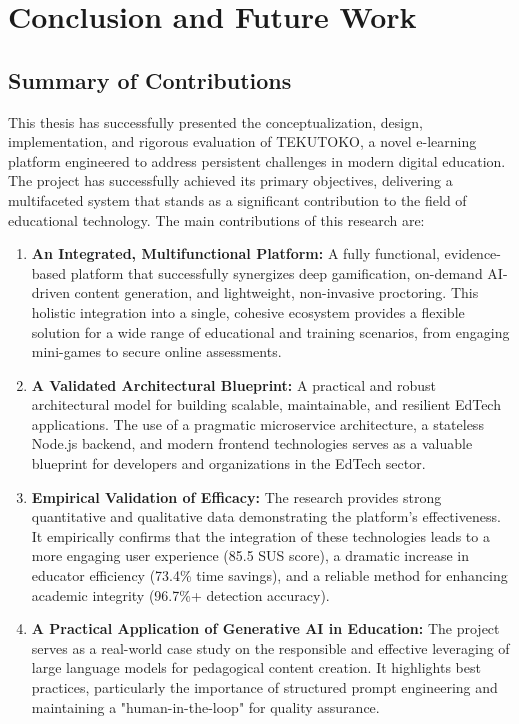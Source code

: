 \chapter{Conclusion and Future Work}
\label{chap:conclusion}

\section{Summary of Contributions}
\label{sec:conclusion-summary}
This thesis has successfully presented the conceptualization, design, implementation, and rigorous evaluation of TEKUTOKO, a novel e-learning platform engineered to address persistent challenges in modern digital education. The project has successfully achieved its primary objectives, delivering a multifaceted system that stands as a significant contribution to the field of educational technology. The main contributions of this research are:

\begin{enumerate}
    \item \textbf{An Integrated, Multifunctional Platform:} A fully functional, evidence-based platform that successfully synergizes deep gamification, on-demand AI-driven content generation, and lightweight, non-invasive proctoring. This holistic integration into a single, cohesive ecosystem provides a flexible solution for a wide range of educational and training scenarios, from engaging mini-games to secure online assessments.

    \item \textbf{A Validated Architectural Blueprint:} A practical and robust architectural model for building scalable, maintainable, and resilient EdTech applications. The use of a pragmatic microservice architecture, a stateless Node.js backend, and modern frontend technologies serves as a valuable blueprint for developers and organizations in the EdTech sector.

    \item \textbf{Empirical Validation of Efficacy:} The research provides strong quantitative and qualitative data demonstrating the platform's effectiveness. It empirically confirms that the integration of these technologies leads to a more engaging user experience (85.5 SUS score), a dramatic increase in educator efficiency (73.4\% time savings), and a reliable method for enhancing academic integrity (96.7\%+ detection accuracy).

    \item \textbf{A Practical Application of Generative AI in Education:} The project serves as a real-world case study on the responsible and effective leveraging of large language models for pedagogical content creation. It highlights best practices, particularly the importance of structured prompt engineering and maintaining a "human-in-the-loop" for quality assurance.
\end{enumerate}

